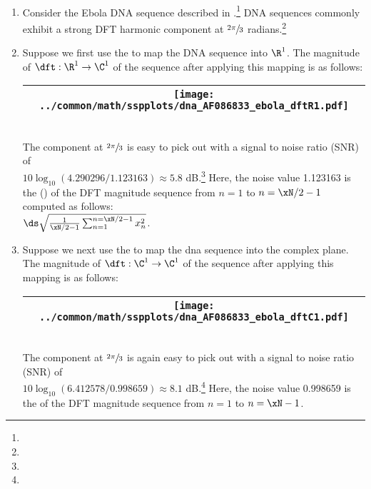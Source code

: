 \begin{example}
\label{ex:dftebola}
\mbox{}\\
\begin{enumerate}
  \item \label{item:dftebola_psp}
     Consider the Ebola DNA sequence described in .\footnote{}
     DNA sequences commonly exhibit a strong DFT harmonic component at $\sfrac{2\pi}{3}$ 
     radians.\footnote{}
  
  \item \label{item:dftebola_R1pam}
    Suppose we first use the   to map
    the DNA sequence into $\R^1$.
    The magnitude of $\dft:\R^1\to\C^1$ of the sequence after applying this mapping is as follows:
    \\\begin{tabular}{|>{\scs}c|}
         \hline
         \texttt{[image: ../common/math/sspplots/dna\_AF086833\_ebola\_dftR1.pdf]}%
       \\\hline
    \end{tabular}\\
    The component at $\sfrac{2\pi}{3}$ is easy to pick out with a signal to noise ratio (SNR) of\\ 
    $10\log_{10}(4.290296/1.123163)\approx5.8$ dB.\footnote{}
    Here, the noise value 1.123163 is the  () of the DFT magnitude 
    sequence from $n=1$ to $n=\xN/2-1$ computed as follows:
    \\\indentx$\ds\sqrt{\frac{1}{\xN/2-1}\sum_{n=1}^{n=\xN/2-1} x_n^2}$.
     
  \item \label{item:dftebola_C1qpsk}
    Suppose we next use the   to map
    the dna sequence into the complex plane.
    The magnitude of $\dft:\C^1\to\C^1$ of the sequence after applying this mapping is as follows:
     \\\begin{tabular}{|>{\scs}c|}
          \hline
          \texttt{[image: ../common/math/sspplots/dna\_AF086833\_ebola\_dftC1.pdf]}%
        \\\hline
     \end{tabular}\\
    The component at $\sfrac{2\pi}{3}$ is again easy to pick out with a signal to noise ratio (SNR) of\\
    $10\log_{10}(6.412578/0.998659)\approx8.1$ dB.\footnote{}
    Here, the noise value 0.998659 is the  of the DFT magnitude 
    sequence from $n=1$ to $n=\xN-1$.


\end{enumerate}
\end{example}
